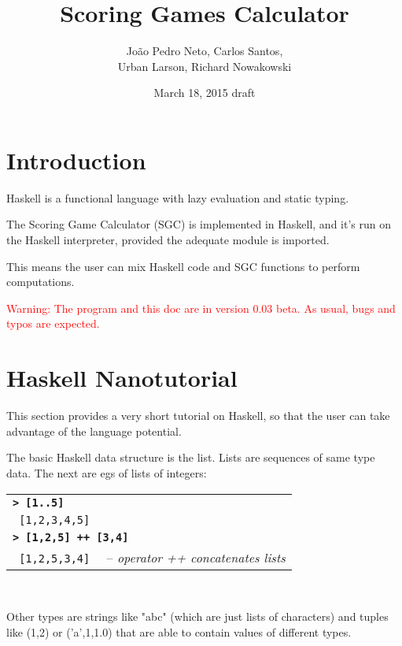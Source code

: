\documentclass[a4paper,12pt]{article}
\newcommand{\bash}[1]{\small\textbf{\lstinline§> #1§}\\}
\newcommand{\out}[1]{\small\lstinline§ #1§}
\newcommand{\hsklcmt}[1]{~~-- \footnotesize\textit{#1}}
\newcommand{\haskellCode}{\fontfamily{pcr}\selectfont}
\newenvironment{sgcode}
	{ \haskellCode
	  \begin{tabular}{|p{0.9\textwidth}|}
      \hline	
	}
	{ \\\hline  
      \end{tabular} \\
	  \par 
	}
\begin{document}
\title{Scoring Games Calculator}
\author{Jo\~{a}o Pedro Neto, Carlos Santos,\\ Urban Larson, Richard Nowakowski}
\date{March 18, 2015 draft}
\maketitle

\newpage

\tableofcontents

\newpage \section*{Introduction}

Haskell is a functional language with lazy evaluation and static typing.

The Scoring Game Calculator (SGC) is implemented in Haskell, and it's run on 
the Haskell interpreter, provided the adequate module is imported. 

This means the user can mix Haskell code and SGC functions to perform computations.

\textcolor{red}{Warning: The program and this doc are in version 0.03 beta. As usual, bugs and typos are expected.}

\section{Haskell Nanotutorial}

This section provides a very short tutorial on Haskell, so that the user can
take advantage of the language potential.

The basic Haskell data structure is the list. Lists are sequences of
same type data. The next are egs of lists of integers:

\begin{sgcode}
\bash{[1..5]}
\out{[1,2,3,4,5]} \\
\bash{[1,2,5] ++ [3,4]} 
\out{[1,2,5,3,4]} \hsklcmt{operator ++ concatenates lists}
\end{sgcode}

Other types are strings like "abc" (which are just lists of characters) 
and tuples like (1,2) or ('a',1,1.0) that are able to contain values of different types.
\end{document}
